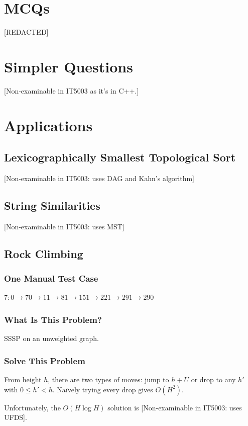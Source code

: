\documentclass[12pt]{article}
\begin{document}
\section{MCQs}
[REDACTED]
\section{Simpler Questions}
[Non-examinable in IT5003 as it’s in C++.]
\section{Applications}
\subsection{Lexicographically Smallest Topological Sort}
[Non-examinable in IT5003: uses DAG and Kahn's algorithm]
\subsection{String Similarities}
[Non-examinable in IT5003: uses MST]
\subsection{Rock Climbing}
\subsubsection{One Manual Test Case}
$7: 0\to70\to11\to81\to151\to221\to291\to290$
\subsubsection{What Is This Problem?}
SSSP on an unweighted graph.
\subsubsection{Solve This Problem}
From height $h$, there are two types of moves: jump to $h+U$ or drop to any $h'$ with $0\le h'<h$. Naïvely trying every drop gives $O(H^2)$.

Unfortunately, the $O(H\log H)$ solution is [Non-examinable in IT5003: uses UFDS].
\end{document}
